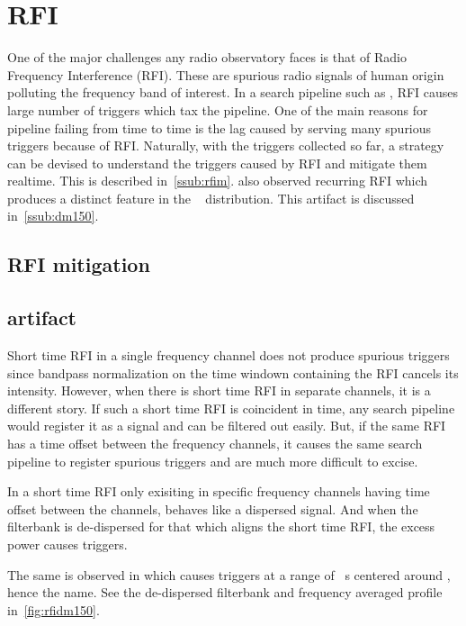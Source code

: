 \section {RFI}

\par One of the major challenges any radio observatory faces is that of Radio Frequency Interference (RFI). 
These are spurious radio signals of human origin polluting the frequency band of interest. In a search pipeline such as \vf, 
RFI causes large number of triggers which tax the pipeline. 
One of the main reasons for \vf pipeline failing from time to time is the lag caused by serving many spurious triggers because of RFI.
Naturally, with the triggers collected so far, a strategy can be devised to understand the triggers caused by RFI and mitigate them realtime.
This is described in~\autoref{ssub:rfim}. \vfpfs also observed recurring RFI which produces a distinct feature in the \dm~ distribution. This artifact is discussed in~\autoref{ssub:dm150}.

\subsection {RFI mitigation}
\label{ssub:rfim}

\subsection { artifact}
\label{ssub:dm150}

\par Short time RFI in a single frequency channel does not produce spurious triggers since bandpass normalization on the time windown containing the RFI cancels its intensity. 
However, when there is short time RFI in separate channels, it is a different story. 
If such a short time RFI is coincident in time, any search pipeline would register it as a  signal and can be filtered out easily.
But, if the same RFI has a time offset between the frequency channels, it causes the same search pipeline to register spurious triggers and are much more difficult to excise.

\par In a short time RFI only exisiting in specific frequency channels having time offset between the channels, behaves like a dispersed signal. And when the filterbank is de-dispersed for that \dm which aligns the short time RFI, the excess power causes triggers. 

\par The same is observed in \vfpfs which causes triggers at a range of \dm~s centered around , hence the name. See the de-dispersed filterbank and frequency averaged profile in~\autoref{fig:rfidm150}.

